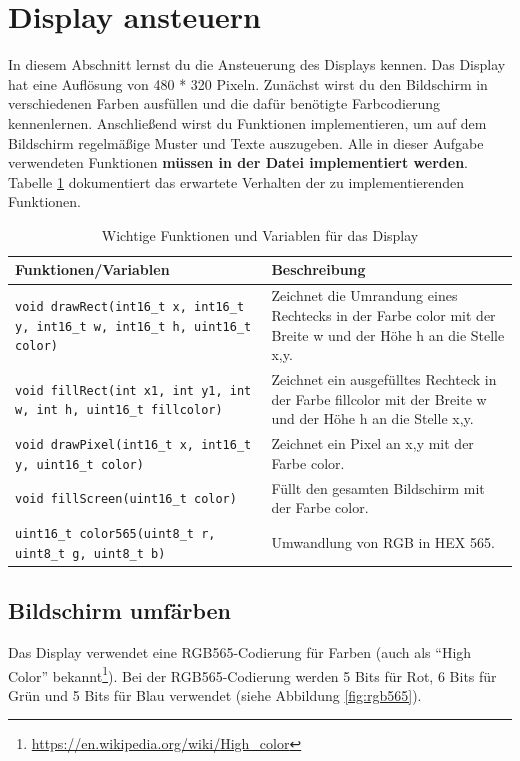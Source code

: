 \section{\ExercisePrefixEmbeddedC Display ansteuern \optional}

\optionaltextbox

In diesem Abschnitt lernst du die Ansteuerung des Displays kennen.
Das Display hat eine Auflösung von 480 * 320 Pixeln.
Zunächst wirst du den Bildschirm in verschiedenen Farben ausfüllen und die dafür benötigte Farbcodierung kennenlernen.
Anschließend wirst du Funktionen implementieren, um auf dem Bildschirm regelmäßige Muster und Texte auszugeben.
Alle in dieser Aufgabe verwendeten Funktionen \textbf{müssen in der Datei  implementiert werden}. 
Tabelle \ref{tab:displayFunctions} dokumentiert das erwartete Verhalten der zu implementierenden Funktionen.
%
\begin{table}
	\centering
	\caption{Wichtige Funktionen und Variablen für das Display}
	\label{tab:displayFunctions}
	\begin{tabular}{p{7cm}p{7cm}}
        \toprule
		\textbf{Funktionen/Variablen} & \textbf{Beschreibung} \\
        \midrule
        \lstinline|void drawRect(int16_t x, int16_t y, int16_t w, int16_t h, uint16_t color)|
        & Zeichnet die Umrandung eines Rechtecks in der Farbe color mit der Breite w und der Höhe h an die Stelle x,y. \\ \hline
		\lstinline|void fillRect(int x1, int y1, int w, int h, uint16_t fillcolor)|
        & Zeichnet ein ausgefülltes Rechteck in der Farbe fillcolor mit der Breite w und der Höhe h an die Stelle x,y. \\ \hline
		\lstinline|void drawPixel(int16_t x, int16_t y, uint16_t color)|
        & Zeichnet ein Pixel an x,y mit der Farbe color. \\ \hline
		\lstinline|void fillScreen(uint16_t color)| 
        & Füllt den gesamten Bildschirm mit der Farbe color. \\ \hline
		\lstinline|uint16_t color565(uint8_t r, uint8_t g, uint8_t b)|
        & Umwandlung von RGB in HEX 565. \\
        \bottomrule
	\end{tabular}
\end{table}

\subsection{Bildschirm umfärben}
Das Display verwendet eine RGB565-Codierung für Farben (auch als \enquote{High Color} bekannt\footnote{\url{https://en.wikipedia.org/wiki/High_color}}).
Bei der RGB565-Codierung werden 5 Bits für Rot, 6 Bits für Grün und 5 Bits für Blau verwendet (siehe Abbildung \ref{fig:rgb565}).

